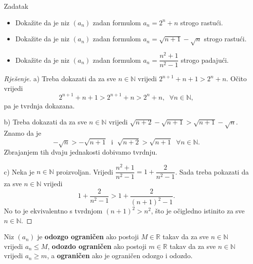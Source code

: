 \begin{exercise}{Zadatak}\textbf{}
\begin{itemize}
\item[a)] Dokažite da je niz \((a_n)\) zadan formulom \(a_n=2^n+n\) strogo rastući.
\item[b)] Dokažite da je niz \((a_n)\) zadan formulom \(a_n=\sqrt{n+1}-\sqrt{n}\) strogo rastući.
\item[c)] Dokažite da je niz \((a_n)\) zadan formulom \(a_n=\dfrac{n^2+1}{n^2-1}\) strogo padajući.
\end{itemize}
\end{exercise}
\begin{proof}[Rješenje]
a) Treba dokazati da za sve \(n\in \mathbb{N}\) vrijedi \(2^{n+1}+n+1>2^n+n\). Očito vrijedi \[2^{n+1}+n+1>2^{n+1}+n>2^n+n, \;\;\forall n\in \mathbb{N},\]
pa je tvrdnja dokazana.

b) Treba dokazati da za sve \(n\in \mathbb{N}\) vrijedi \(\sqrt{n+2}-\sqrt{n+1}>\sqrt{n+1}-\sqrt{n}\). Znamo da je \[-\sqrt{n}>-\sqrt{n+1}\;\text{ i }\;\sqrt{n+2}>\sqrt{n+1}\;\;\forall n\in \mathbb{N}.\] Zbrajanjem tih dvaju jednakosti dobivamo tvrdnju.

c) Neka je \(n\in \mathbb{N}\) proizvoljan. Vrijedi \(\dfrac{n^2+1}{n^2-1}=1+\dfrac{2}{n^2-1}\). Sada treba pokazati da za sve \(n\in \mathbb{N}\) vrijedi 
\[1+\dfrac{2}{n^2-1}>1+\dfrac{2}{(n+1)^2-1}.\]
No to je ekvivalentno s tvrdnjom \((n+1)^2>n^2\), što je očigledno istinito za sve \(n\in \mathbb{N}\).
\end{proof}

\begin{definition}
Niz \((a_n)\) je \textbf{odozgo ograničen} ako postoji \(M\in \mathbb{R}\) takav da za sve \(n\in \mathbb{N}\) vrijedi \(a_n\leq M\), \textbf{odozdo ograničen} ako postoji \(m\in \mathbb{R}\) takav da za sve \(n\in \mathbb{N}\) vrijedi \(a_n\geq m\), a \textbf{ograničen} ako je ograničen odozgo i odozdo.
\end{definition}

